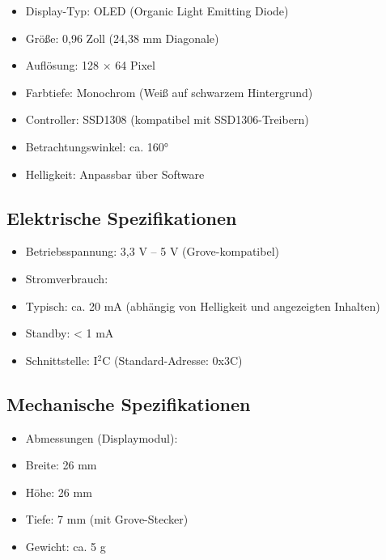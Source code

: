 \begin{itemize}
	\item Display-Typ: OLED (Organic Light Emitting Diode)
	
	\item Größe: 0,96 Zoll (24,38 mm Diagonale)
	
	\item Auflösung: 128 × 64 Pixel
	
	\item Farbtiefe: Monochrom (Weiß auf schwarzem Hintergrund)
	
	\item Controller: SSD1308 (kompatibel mit SSD1306-Treibern)
	
	\item Betrachtungswinkel: ca. 160°
	
	\item Helligkeit: Anpassbar über Software
\end{itemize}
\cite{Seeedstudio:2025b}

\subsection{Elektrische Spezifikationen}

\begin{itemize}
	\item Betriebsspannung: 3,3 V – 5 V (Grove-kompatibel)
	
	\item Stromverbrauch:
	
	\item Typisch: ca. 20 mA (abhängig von Helligkeit und angezeigten Inhalten)
	
	\item Standby: < 1 mA
	
	\item Schnittstelle: I$^2$C (Standard-Adresse: 0x3C)
\end{itemize}
\cite{Seeedstudio:2025b}

\subsection{Mechanische Spezifikationen}

\begin{itemize}
	\item Abmessungen (Displaymodul):
	
	\item Breite: 26 mm
	
	\item Höhe: 26 mm
	
	\item Tiefe: 7 mm (mit Grove-Stecker)
	
	\item Gewicht: ca. 5 g
\end{itemize}
\cite{Seeedstudio:2025b}

